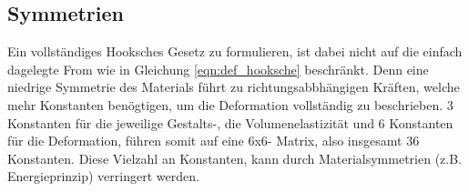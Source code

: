 \subsection{Symmetrien}
Ein vollständiges Hooksches Gesetz zu formulieren, ist dabei nicht auf die einfach dagelegte From wie 
in Gleichung \eqref{eqn:def_hooksche} beschränkt.
Denn eine niedrige Symmetrie des Materials führt zu richtungsabbhängigen Kräften, welche mehr Konstanten
benögtigen, um die Deformation vollständig zu beschrieben.
3 Konstanten für die jeweilige Gestalts-, die Volumenelastizität und 6 Konstanten für die Deformation,
führen somit auf eine 6x6- Matrix, also insgesamt 36 Konstanten.\newline
Diese Vielzahl an Konstanten, kann durch Materialsymmetrien (z.\;B. Energieprinzip) verringert werden.




